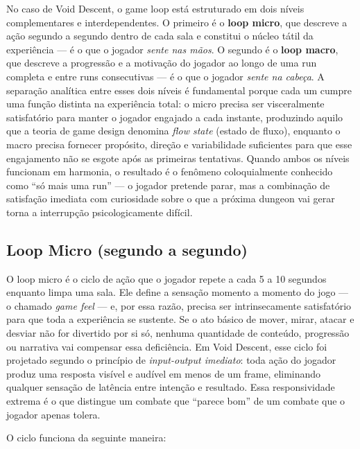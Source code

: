 \documentclass[12pt, a4paper]{article}
\begin{document}
No caso de Void Descent, o game loop est\'a estruturado em dois n\'iveis complementares e interdependentes. O primeiro \'e o \textbf{loop micro}, que descreve a a\c{c}\~ao segundo a segundo dentro de cada sala e constitui o n\'ucleo t\'atil da experi\^encia --- \'e o que o jogador \textit{sente nas m\~aos}. O segundo \'e o \textbf{loop macro}, que descreve a progress\~ao e a motiva\c{c}\~ao do jogador ao longo de uma run completa e entre runs consecutivas --- \'e o que o jogador \textit{sente na cabe\c{c}a}. A separa\c{c}\~ao anal\'itica entre esses dois n\'iveis \'e fundamental porque cada um cumpre uma fun\c{c}\~ao distinta na experi\^encia total: o micro precisa ser visceralmente satisfat\'orio para manter o jogador engajado a cada instante, produzindo aquilo que a teoria de game design denomina \textit{flow state} (estado de fluxo), enquanto o macro precisa fornecer prop\'osito, dire\c{c}\~ao e variabilidade suficientes para que esse engajamento n\~ao se esgote ap\'os as primeiras tentativas. Quando ambos os n\'iveis funcionam em harmonia, o resultado \'e o fen\^omeno coloquialmente conhecido como ``s\'o mais uma run'' --- o jogador pretende parar, mas a combina\c{c}\~ao de satisfa\c{c}\~ao imediata com curiosidade sobre o que a pr\'oxima dungeon vai gerar torna a interrup\c{c}\~ao psicologicamente dif\'icil.

\subsection{Loop Micro (segundo a segundo)}

O loop micro \'e o ciclo de a\c{c}\~ao que o jogador repete a cada 5 a 10 segundos enquanto limpa uma sala. Ele define a sensa\c{c}\~ao momento a momento do jogo --- o chamado \textit{game feel} --- e, por essa raz\~ao, precisa ser intrinsecamente satisfat\'orio para que toda a experi\^encia se sustente. Se o ato b\'asico de mover, mirar, atacar e desviar n\~ao for divertido por si s\'o, nenhuma quantidade de conte\'udo, progress\~ao ou narrativa vai compensar essa defici\^encia. Em Void Descent, esse ciclo foi projetado segundo o princ\'ipio de \textit{input-output imediato}: toda a\c{c}\~ao do jogador produz uma resposta vis\'ivel e aud\'ivel em menos de um frame, eliminando qualquer sensa\c{c}\~ao de lat\^encia entre inten\c{c}\~ao e resultado. Essa responsividade extrema \'e o que distingue um combate que ``parece bom'' de um combate que o jogador apenas tolera.

O ciclo funciona da seguinte maneira:
\end{document}

